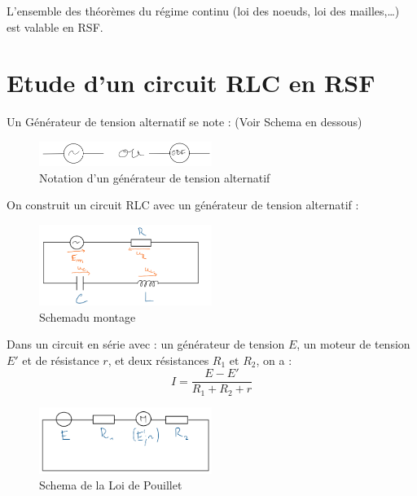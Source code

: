 \begin{theorem}
    L'ensemble des théorèmes du régime continu (loi des noeuds, loi des mailles,\dots) est valable en RSF.
\end{theorem}

\section{Etude d'un circuit RLC en RSF}

\begin{notation}
    Un Générateur de tension alternatif se note : (Voir Schema en dessous)  
\end{notation}

\begin{figure}[!htb]
    \centering
    \includegraphics[width=0.5\textwidth]{SCHEMA9.png}
    \caption{Notation d'un générateur de tension alternatif}
    \label{fig:SCHEMA9}
\end{figure}

On construit un circuit RLC avec un générateur de tension alternatif : 
\begin{figure}[!htb]
    \centering
    \includegraphics[width=0.5\textwidth]{SCHEMA10.png}
    \caption{Schemadu montage}
    \label{fig:SCHEMA10}
\end{figure}

\begin{theorem}
    Dans un circuit en série avec :  un générateur de tension \(E\), un moteur de tension \(E'\) et de résistance \(r\), et deux résistances \(R_{1} \text{ et } R_{2}\), on a : 
    \[
        I = \frac{E-E'}{R_{1}+R_{2}+r}
    \] 
\end{theorem}

\begin{figure}[!htb]
    \centering
    \includegraphics[width=0.5\textwidth]{SCHEMA11.png}
    \caption{Schema de la Loi de Pouillet}
    \label{fig:SCHEMA11}
\end{figure}


